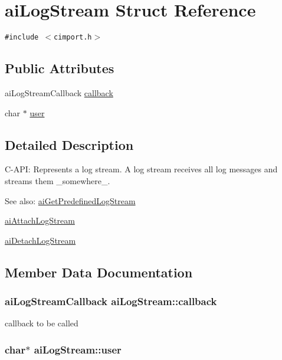 \hypertarget{structai_log_stream}{
\section{aiLogStream Struct Reference}
\label{structai_log_stream}
}
{\tt \#include $<$cimport.h$>$}

\subsection*{Public Attributes}
\begin{CompactItemize}
\item 
aiLogStreamCallback \hyperlink{structai_log_stream_c73ae46eee54ba0f920d6abb97c33e97}{callback}
\item 
char $\ast$ \hyperlink{structai_log_stream_3382042e4171a6dd5a71d7f98741f86e}{user}
\end{CompactItemize}


\subsection{Detailed Description}
C-API: Represents a log stream. A log stream receives all log messages and streams them \_\-somewhere\_\-. \begin{Desc}
\item[See also:]\hyperlink{cimport_8h_d7e375d7b134ec590e812ad1f50eab94}{aiGetPredefinedLogStream} 

\hyperlink{cimport_8h_75c5aa6027cb059e63b3dda005c9c149}{aiAttachLogStream} 

\hyperlink{cimport_8h_98ad05bb95e8f8157a97c133812a1597}{aiDetachLogStream} \end{Desc}


\subsection{Member Data Documentation}
\hypertarget{structai_log_stream_c73ae46eee54ba0f920d6abb97c33e97}{
\subsubsection[callback]{\setlength{\rightskip}{0pt plus 5cm}aiLogStreamCallback {\bf aiLogStream::callback}}}
\label{structai_log_stream_c73ae46eee54ba0f920d6abb97c33e97}


callback to be called \hypertarget{structai_log_stream_3382042e4171a6dd5a71d7f98741f86e}{
\subsubsection[user]{\setlength{\rightskip}{0pt plus 5cm}char$\ast$ {\bf aiLogStream::user}}}
\label{structai_log_stream_3382042e4171a6dd5a71d7f98741f86e}


